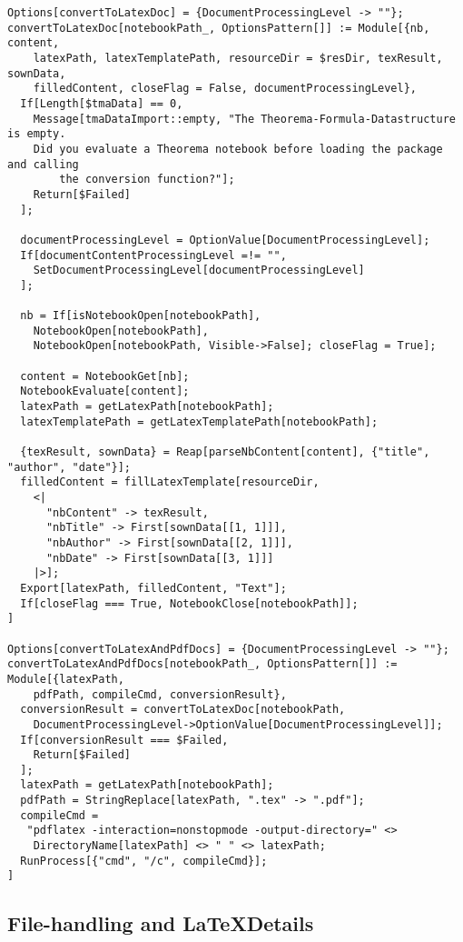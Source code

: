 \begin{verbatim}
Options[convertToLatexDoc] = {DocumentProcessingLevel -> ""};
convertToLatexDoc[notebookPath_, OptionsPattern[]] := Module[{nb, content, 
    latexPath, latexTemplatePath, resourceDir = $resDir, texResult, sownData, 
    filledContent, closeFlag = False, documentProcessingLevel},
  If[Length[$tmaData] == 0, 
    Message[tmaDataImport::empty, "The Theorema-Formula-Datastructure is empty. 
    Did you evaluate a Theorema notebook before loading the package and calling 
        the conversion function?"];
    Return[$Failed]
  ];

  documentProcessingLevel = OptionValue[DocumentProcessingLevel];
  If[documentContentProcessingLevel =!= "", 
    SetDocumentProcessingLevel[documentProcessingLevel]
  ];

  nb = If[isNotebookOpen[notebookPath],
    NotebookOpen[notebookPath],
    NotebookOpen[notebookPath, Visible->False]; closeFlag = True];
  
  content = NotebookGet[nb];
  NotebookEvaluate[content];
  latexPath = getLatexPath[notebookPath];
  latexTemplatePath = getLatexTemplatePath[notebookPath]; 

  {texResult, sownData} = Reap[parseNbContent[content], {"title", "author", "date"}];
  filledContent = fillLatexTemplate[resourceDir,
    <|
      "nbContent" -> texResult,
      "nbTitle" -> First[sownData[[1, 1]]],
      "nbAuthor" -> First[sownData[[2, 1]]],
      "nbDate" -> First[sownData[[3, 1]]]
    |>];
  Export[latexPath, filledContent, "Text"];
  If[closeFlag === True, NotebookClose[notebookPath]]; 
]

Options[convertToLatexAndPdfDocs] = {DocumentProcessingLevel -> ""};
convertToLatexAndPdfDocs[notebookPath_, OptionsPattern[]] := Module[{latexPath, 
    pdfPath, compileCmd, conversionResult},
  conversionResult = convertToLatexDoc[notebookPath, 
    DocumentProcessingLevel->OptionValue[DocumentProcessingLevel]];
  If[conversionResult === $Failed,
    Return[$Failed]
  ];
  latexPath = getLatexPath[notebookPath];
  pdfPath = StringReplace[latexPath, ".tex" -> ".pdf"];
  compileCmd = 
   "pdflatex -interaction=nonstopmode -output-directory=" <> 
    DirectoryName[latexPath] <> " " <> latexPath;
  RunProcess[{"cmd", "/c", compileCmd}];
]
\end{verbatim}

\subsection{File-handling and \LaTeX Details}

